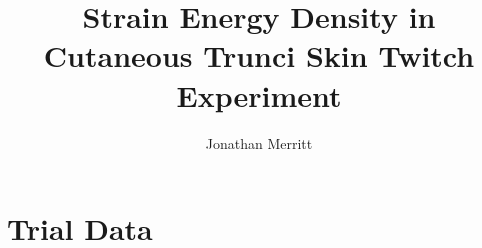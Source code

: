 \documentclass[
  a4paper,
  11pt,
  twoside,
  toc=flat,
  listof=flat
]{scrbook}
\begin{document}
\title{Strain Energy Density in Cutaneous Trunci Skin Twitch Experiment}
\author{Jonathan Merritt}
\begin{titlepage}
  \maketitle
\end{titlepage}

\tableofcontents
\listoftables
\listoffigures

\chapter{Trial Data}


\end{document}
